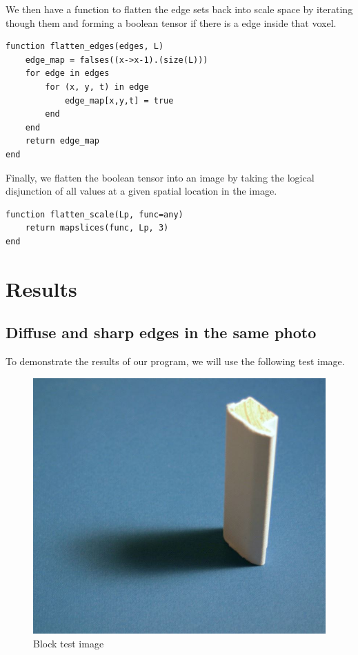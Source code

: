 \documentclass{article}
\begin{document}
We then have a function to flatten the edge sets back into scale space by iterating though them and forming a boolean tensor if there is a edge inside that voxel.
\begin{lstlisting}
function flatten_edges(edges, L)
    edge_map = falses((x->x-1).(size(L)))
    for edge in edges
        for (x, y, t) in edge
            edge_map[x,y,t] = true
        end
    end
    return edge_map
end
\end{lstlisting}

Finally, we flatten the boolean tensor into an image by taking the logical disjunction of all values at a given spatial location in the image.
\begin{lstlisting}
function flatten_scale(Lp, func=any)
    return mapslices(func, Lp, 3)
end
\end{lstlisting}

\section{Results}
\subsection{Diffuse and sharp edges in the same photo}
To demonstrate the results of our program, we will use the following test image.
\begin{figure}[H]
  \centering
  \includegraphics[scale=0.36]{Images/block/block_orig.jpg}
  \caption{Block test image}
  \label{block_orig}
\end{figure}
\end{document}
